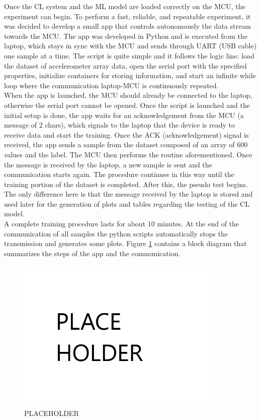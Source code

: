 \documentclass[12pt]{report}
\begin{document}
Once the CL system and the ML model are loaded correctly on the MCU, the experiment can begin. To perform a fast, reliable, and repeatable experiment, it was decided to develop a small app that controls autonomously the data stream towards the MCU. The app was developed in Python and is executed from the laptop, which stays in sync with the MCU and sends through UART (USB cable) one sample at a time. The script is quite simple and it follows the logic line: load the dataset of accelerometer array data, open the serial port with the specified properties, initialize containers for storing information, and start an infinite while loop where the communication laptop-MCU is continuously repeated. \\
When the app is launched, the MCU should already be connected to the laptop, otherwise the serial port cannot be opened. Once the script is launched and the initial setup is done, the app waits for an acknowledgement from the MCU (a message of 2 chars), which signals to the laptop that the device is ready to receive data and start the training. Once the ACK (acknowledgement) signal is received, the app sends a sample from the dataset composed of an array of 600 values and the label. The MCU then performs the routine aforementioned. Once the message is received by the laptop, a new sample is sent and the communication starts again. The procedure continues in this way until the training portion of the dataset is completed. After this, the pseudo test begins. The only difference here is that the message received by the laptop is stored and used later for the generation of plots and tables regarding the testing of the CL model.\\
A complete training procedure lasts for about 10 minutes. At the end of the communication of all samples the python scripts automatically stops the transmission and generates some plots. Figure \ref{fig:python_stm_diagram} contains a block diagram that summarizes the steps of the app and the communication.

\begin{figure}[h!]
    \centering
    \includegraphics[width=100mm]{Figures/Chapter4/PLACEHOLDER.jpg} 
    \caption{PLACEHOLDER}
    \label{fig:python_stm_diagram}    
\end{figure}
\end{document}
